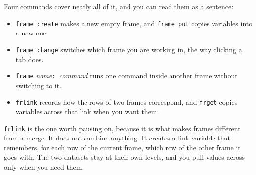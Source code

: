 \documentclass[
    a4paper,
    fontsize=10pt,
    twoside=true,
    numbers=noenddot,
]{kaobook}
\begin{document}
Four commands cover nearly all of it, and you can read them as a sentence:
\begin{itemize}
    \item \texttt{frame create} makes a new empty frame, and \texttt{frame put} copies variables into a new one.
    \item \texttt{frame change} switches which frame you are working in, the way clicking a tab does.
    \item \texttt{frame} \emph{name}\texttt{: }\emph{command} runs one command inside another frame without switching to it.
    \item \texttt{frlink} records how the rows of two frames correspond, and \texttt{frget} copies variables across that link when you want them.
\end{itemize}
\texttt{frlink} is the one worth pausing on, because it is what makes frames different from a merge. It does not combine anything. It creates a link variable that remembers, for each row of the current frame, which row of the other frame it goes with. The two datasets stay at their own levels, and you pull values across only when you need them.
\end{document}
